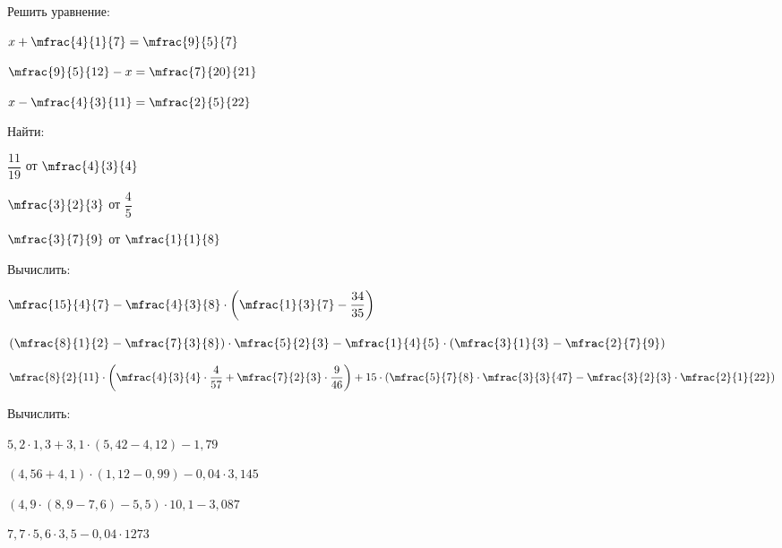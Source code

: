 \begin{homework}[number=2]
	\begin{listofex}
		\item Решить уравнение:
		\begin{enumcols}[itemcolumns=3]
			\item \( x+\mfrac{4}{1}{7}=\mfrac{9}{5}{7} \)
			\item \( \mfrac{9}{5}{12}-x=\mfrac{7}{20}{21} \)
			\item \( x-\mfrac{4}{3}{11}=\mfrac{2}{5}{22} \)
		\end{enumcols}
		\item Найти:
		\begin{enumcols}[itemcolumns=3]
			\item \( \dfrac{11}{19} \) от \( \mfrac{4}{3}{4} \)
			\item \( \mfrac{3}{2}{3} \) от \( \dfrac{4}{5} \)
			\item \( \mfrac{3}{7}{9} \) от \( \mfrac{1}{1}{8} \)
		\end{enumcols}
		\item Вычислить: %
		\begin{enumcols}[itemcolumns=2]
			\item \( \mfrac{15}{4}{7}-\mfrac{4}{3}{8}\cdot\left( \mfrac{1}{3}{7}-\dfrac{34}{35} \right) \)
			\item \( \left( \mfrac{8}{1}{2}-\mfrac{7}{3}{8} \right)\cdot\mfrac{5}{2}{3}-\mfrac{1}{4}{5}\cdot\left( \mfrac{3}{1}{3}-\mfrac{2}{7}{9} \right) \)
		\end{enumcols}
		\begin{enumcols}[itemcolumns=1, resume]
			\item \( \mfrac{8}{2}{11}\cdot\left( \mfrac{4}{3}{4}\cdot\dfrac{4}{57}+\mfrac{7}{2}{3}\cdot\dfrac{9}{46} \right)+15\cdot\left( \mfrac{5}{7}{8}\cdot\mfrac{3}{3}{47}-\mfrac{3}{2}{3}\cdot\mfrac{2}{1}{22} \right) \)
		\end{enumcols}
		\item Вычислить:
		\begin{enumcols}[itemcolumns=2]
			\item \( 5,2\cdot1,3+3,1\cdot(5,42-4,12)-1,79 \)
			\item \( (4,56+4,1)\cdot(1,12-0,99)-0,04\cdot3,145 \)
			\item \( (4,9\cdot(8,9-7,6)-5,5)\cdot10,1-3,087 \)
			\item \( 7,7\cdot5,6\cdot3,5-0,04\cdot1273 \)
		\end{enumcols}
	\end{listofex}
\end{homework}
